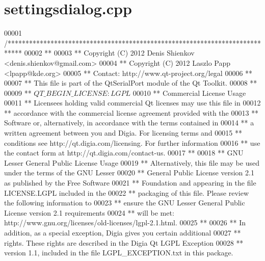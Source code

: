 \hypertarget{a00044_source}{\section{settingsdialog.\+cpp}
\label{a00044_source}
}

\begin{DoxyCode}
00001 \textcolor{comment}{/****************************************************************************}
00002 \textcolor{comment}{**}
00003 \textcolor{comment}{** Copyright (C) 2012 Denis Shienkov <denis.shienkov@gmail.com>}
00004 \textcolor{comment}{** Copyright (C) 2012 Laszlo Papp <lpapp@kde.org>}
00005 \textcolor{comment}{** Contact: http://www.qt-project.org/legal}
00006 \textcolor{comment}{**}
00007 \textcolor{comment}{** This file is part of the QtSerialPort module of the Qt Toolkit.}
00008 \textcolor{comment}{**}
00009 \textcolor{comment}{** $QT\_BEGIN\_LICENSE:LGPL$}
00010 \textcolor{comment}{** Commercial License Usage}
00011 \textcolor{comment}{** Licensees holding valid commercial Qt licenses may use this file in}
00012 \textcolor{comment}{** accordance with the commercial license agreement provided with the}
00013 \textcolor{comment}{** Software or, alternatively, in accordance with the terms contained in}
00014 \textcolor{comment}{** a written agreement between you and Digia.  For licensing terms and}
00015 \textcolor{comment}{** conditions see http://qt.digia.com/licensing.  For further information}
00016 \textcolor{comment}{** use the contact form at http://qt.digia.com/contact-us.}
00017 \textcolor{comment}{**}
00018 \textcolor{comment}{** GNU Lesser General Public License Usage}
00019 \textcolor{comment}{** Alternatively, this file may be used under the terms of the GNU Lesser}
00020 \textcolor{comment}{** General Public License version 2.1 as published by the Free Software}
00021 \textcolor{comment}{** Foundation and appearing in the file LICENSE.LGPL included in the}
00022 \textcolor{comment}{** packaging of this file.  Please review the following information to}
00023 \textcolor{comment}{** ensure the GNU Lesser General Public License version 2.1 requirements}
00024 \textcolor{comment}{** will be met: http://www.gnu.org/licenses/old-licenses/lgpl-2.1.html.}
00025 \textcolor{comment}{**}
00026 \textcolor{comment}{** In addition, as a special exception, Digia gives you certain additional}
00027 \textcolor{comment}{** rights.  These rights are described in the Digia Qt LGPL Exception}
00028 \textcolor{comment}{** version 1.1, included in the file LGPL\_EXCEPTION.txt in this package.}

\end{DoxyCode}
